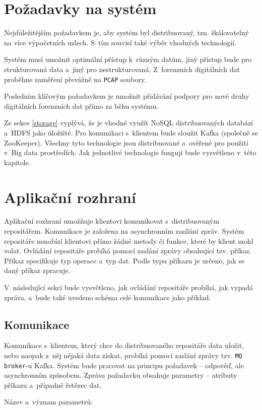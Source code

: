 \section{Požadavky na systém}
Nejdůležitějším požadavkem je, aby systém byl distribuovaný, tzn. škálovatelný na více výpočetních uzlech. S~tím souvisí také výběr vhodných technologií.

Systém musí umožnit optimální přístup k~různým datům, jiný přístup bude pro strukturovaná data a~jiný pro nestrukturovaná. Z~forenzních digitálních dat proběhne zaměření převážně na \texttt{PCAP} soubory.

Posledním klíčovým požadavkem je umožnit přidávání podpory pro nové druhy digitálních forenzních dat přímo za běhu systému.

Ze sekce \ref{storage} vyplývá, že je vhodné využít NoSQL distribuovaných databází a~HDFS jako úložiště. Pro komunikaci s~klientem bude sloužit Kafka (společně se ZooKeeper). Všechny tyto technologie jsou distribuované a~ověřené pro použití v~Big data prostředích. Jak jednotlivé technologie fungují bude vysvětleno v~této kapitole.

\section{Aplikační rozhraní}
Aplikační rozhraní umožňuje klientovi komunikovat s~distribuovaným repositářem. Komunikace je založena na asynchronním zasílání zpráv. Systém repositáře nenabízí klientovi přímo žádné metody či funkce, které by klient mohl volat. Ovládání repositáře probíhá pomocí zaslání zprávy obsahující tzv. příkaz. Příkaz specifikuje typ operace a~typ dat. Podle typu příkazu je určeno, jak se daný příkaz zpracuje.

V~následující sekci bude vysvětleno, jak ovládání repositáře probíhá, jak vypadá zpráva, a~bude také uvedeno schéma celé komunikace jako příklad.

\subsection{Komunikace} \label{designCommunication}
Komunikace s~klientem, který chce do distribuovaného repositáře data uložit, nebo naopak z~něj nějaká data získat, probíhá pomocí zaslání zprávy tzv. \texttt{MQ broker}-u Kafka. Systém bude pracovat na principu požadavek -- odpověď, ale asynchronním způsobem. Zpráva požadavku obsahuje parametry -- atributy příkazu a~případně řetězec dat.

\vspace{0.5cm}
\noindent Název a~význam parametrů:

